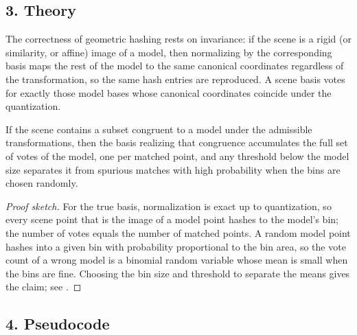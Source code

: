 \subsection{3. Theory}

The correctness of geometric hashing rests on invariance: if the scene is a
rigid (or similarity, or affine) image of a model, then normalizing by the
corresponding basis maps the rest of the model to the same canonical
coordinates regardless of the transformation, so the same hash entries are
reproduced. A scene basis votes for exactly those model bases whose
canonical coordinates coincide under the quantization.

\begin{theorem}\label{thm:match_hashing_voting}
  If the scene contains a subset congruent to a model under the admissible
  transformations, then the basis realizing that congruence accumulates the
  full set of votes of the model, one per matched point, and any threshold
  below the model size separates it from spurious matches with high
  probability when the bins are chosen randomly.
\end{theorem}

\begin{proof}[Proof sketch]
  For the true basis, normalization is exact up to quantization, so every
  scene point that is the image of a model point hashes to the model's bin;
  the number of votes equals the number of matched points. A random model
  point hashes into a given bin with probability proportional to the bin
  area, so the vote count of a wrong model is a binomial random variable
  whose mean is small when the bins are fine. Choosing the bin size and
  threshold to separate the means gives the claim; see \cite{wolfson1997,
  alt1999}.
\end{proof}

\subsection{4. Pseudocode}


